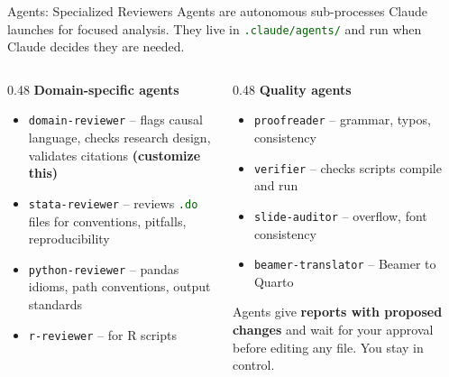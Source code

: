 \documentclass[aspectratio=169,11pt,dvipsnames]{beamer}
\newcommand{\file}[1]{\textcolor{darkgreen}{\nolinkurl{#1}}}
\begin{document}
\begin{frame}{Agents: Specialized Reviewers}
  Agents are autonomous sub-processes Claude launches for focused analysis.
  They live in \file{.claude/agents/} and run when Claude decides they are needed.

  \vspace{0.3cm}
  \begin{columns}[T]
    \begin{column}{0.48\textwidth}
      \textbf{Domain-specific agents}
      \begin{itemize}
        \item \texttt{domain-reviewer} -- flags causal language, checks research design, validates citations \textbf{(customize this)}
        \item \texttt{stata-reviewer} -- reviews \file{.do} files for conventions, pitfalls, reproducibility
        \item \texttt{python-reviewer} -- pandas idioms, path conventions, output standards
        \item \texttt{r-reviewer} -- for R scripts
      \end{itemize}
    \end{column}
    \begin{column}{0.48\textwidth}
      \textbf{Quality agents}
      \begin{itemize}
        \item \texttt{proofreader} -- grammar, typos, consistency
        \item \texttt{verifier} -- checks scripts compile and run
        \item \texttt{slide-auditor} -- overflow, font consistency
        \item \texttt{beamer-translator} -- Beamer to Quarto
      \end{itemize}
      \vspace{0.3cm}
      \begin{greenbox}
        \small Agents give \textbf{reports with proposed changes} and wait for
        your approval before editing any file. You stay in control.
      \end{greenbox}
    \end{column}
  \end{columns}
\end{frame}
\end{document}

